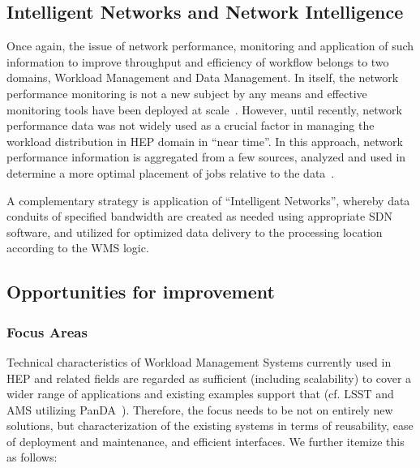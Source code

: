\subsection{Intelligent Networks and Network Intelligence}

Once again, the issue of network performance, monitoring and application of such information to improve
throughput and efficiency of workflow belongs to two domains, Workload Management and Data Management. In itself, the network performance monitoring is not a new subject by any means and effective monitoring tools have been deployed at scale~\cite{perfsonar_chep12}. However, until recently, network performance data was not
widely used as a crucial factor in managing the workload distribution in HEP domain in ``near time''. In this approach, network performance information is aggregated from a few sources, analyzed and used in determine a more optimal placement of jobs relative to the data~\cite{panda_chep13}.

A complementary strategy is application of ``Intelligent Networks'', whereby data conduits of specified bandwidth
are created as needed using appropriate SDN software, and utilized for optimized data delivery to the processing location
according to the WMS logic.


\subsection{Opportunities for improvement}


\subsubsection{Focus Areas}
\label{wms_focus}
Technical characteristics of Workload Management Systems currently used in HEP and related fields are regarded
as sufficient (including scalability) to cover a wider range of applications and existing examples support that
(cf. LSST and AMS utilizing PanDA~\cite{pandamon_isgc14}). Therefore, the focus needs to be not on entirely new solutions,
but characterization of the existing systems in terms of reusability, ease of deployment and maintenance, and efficient interfaces.
We further itemize this as follows:

